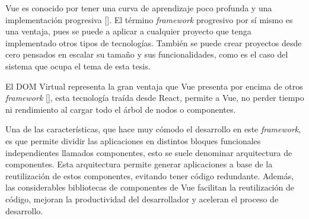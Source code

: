 
Vue es conocido por tener una curva de aprendizaje poco profunda y una implementación progresiva [\cite{49}]. El término \textit{framework} progresivo por sí mismo es una ventaja, pues se puede a aplicar a cualquier proyecto que tenga implementado otros tipos de tecnologías. También se puede crear proyectos desde cero pensados en escalar su tamaño y sus funcionalidades, como es el caso del sistema que ocupa el tema de esta tesis.


El DOM Virtual representa la gran ventaja que Vue presenta por encima de otros \textit{framework} [\cite{52}], esta tecnología traída desde React, permite a Vue, no perder tiempo ni rendimiento al cargar todo el árbol de nodos o componentes.

Una de las características, que hace muy cómodo el desarrollo en este \textit{framework}, es que permite dividir las aplicaciones en distintos bloques funcionales independientes llamados componentes, esto se suele denominar arquitectura de componentes. Esta arquitectura permite generar aplicaciones a base de la reutilización de estos componentes, evitando tener código redundante. Además, las considerables bibliotecas de componentes de Vue facilitan la reutilización de código, mejoran la productividad del desarrollador y aceleran el proceso de desarrollo.



